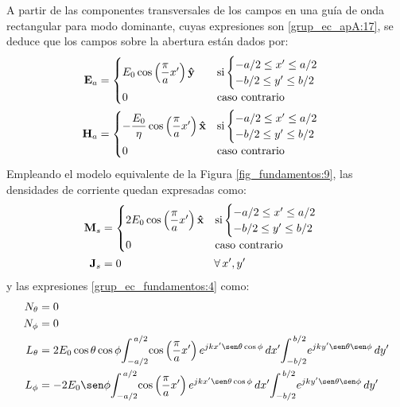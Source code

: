 A partir de las componentes transversales de los campos en una guía de onda rectangular para modo dominante, cuyas expresiones son \eqref{grup_ec_apA:17}, se deduce que los campos sobre la abertura están dados por:
\begin{align}
\mathbf{E}_a &= 
\begin{cases}
\makebox[0pt][l]{$E_0\cos\left(\dfrac{\pi}{a}x'\right)\versor{y}$}\hphantom{-\dfrac{E_0}{\eta}\cos\left(\dfrac{\pi}{a}x'\right)\versor{x}} &\text{si}
\begin{cases} 
-a/2 \leq x' \leq a/2\\
-b/2 \leq y' \leq b/2
\end{cases}\\
0  &\text{caso contrario}
\end{cases}
\label{ec_apB:25}\\
\mathbf{H}_a &= 
\begin{cases} 
-\dfrac{E_0}{\eta}\cos\left(\dfrac{\pi}{a}x'\right)\versor{x} &\text{si}
\begin{cases} 
-a/2 \leq x' \leq a/2\\
-b/2 \leq y' \leq b/2
\end{cases}\\
0  & \text{caso contrario}
\end{cases}
\label{ec_apB:26}
\end{align}
Empleando el modelo equivalente de la Figura \ref{fig_fundamentos:9}, las densidades de corriente quedan expresadas como:
\begin{align}
\mathbf{M}_s &=
\begin{cases}
2E_0\cos\left(\dfrac{\pi}{a}x'\right)\versor{x} & \text{si}
\begin{cases} 
-a/2 \leq x' \leq a/2\\
-b/2 \leq y' \leq b/2
\end{cases}\\
0 & \text{caso contrario}
\end{cases}
\label{ec_apB:27}\\
\mathbf{J}_s &= \makebox[0pt][l]{$0$} 
\hphantom{\begin{cases} 2E_0\cos\left(\dfrac{\pi}{a}x'\right)\versor{x}\\0\end{cases}}\kern-\nulldelimiterspace
\forall\,x',y'
\label{ec_apB:28}
\end{align}
y las expresiones \eqref{grup_ec_fundamentos:4} como:
\begin{subequations}
\label{grup_ec_apB:6}
\begin{align}
N_{\theta} &= 0
\label{ec_apB:29}\\
N_{\phi} &= 0
\label{ec_apB:30}\\
L_{\theta}  &= 2E_0\cos\theta\cos\phi\!\int_{-a/2}^{\,a/2}\!\cos\left(\dfrac{\pi}{a}x'\right)e^{jkx'\sen\theta\cos\phi}\,dx'\!\int_{-b/2}^{\,b/2}\!e^{jky'\sen\theta\sen\phi}\,dy'
\label{ec_apB:31}\\
L_{\phi} &= -2E_0\sen\phi\!\int_{-a/2}^{\,a/2}\!\cos\left(\dfrac{\pi}{a}x'\right)e^{jkx'\sen\theta\cos\phi}\,dx'\!\int_{-b/2}^{\,b/2}\!e^{jky'\sen\theta\sen\phi}\,dy'
\label{ec_apB:32}
\end{align}
\end{subequations}
